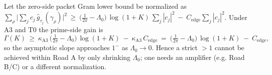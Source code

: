\begin{remark}
Let the zero-side packet Gram lower bound be normalized as
\(\sum_{\rho}\big|\sum_j c_j\,\widehat g_{\tau_j}(\gamma_\rho)\big|^2\ \ge\ \big(\tfrac{1}{2\pi}-\Lambda_0\big)\,\log(1{+}K)\,\sum_j|c_j|^2\ -\ C_{\mathrm{edge}}\sum_j|c_j|^2\).
Under A3 and T0 the prime-side gain is
\begin{equation}\label{eq:A3_calibration_kappa-formula-1}
 \Gamma(K)\ \ge\ \kappa_{\mathrm{A3}}\,\Big(\tfrac{1}{2\pi}-\Lambda_0\Big)\,\log(1{+}K)\ -\ \kappa_{\mathrm{A3}}\,C_{\mathrm{edge}}\ =\ \Big(\tfrac{1}{2\pi}-\Lambda_0\Big)\,\log(1{+}K)\ -\ C_{\mathrm{edge}},
\end{equation}
so the asymptotic slope approaches $1^{-}$ as $\Lambda_0\to0$. Hence a strict $>1$ cannot be achieved within Road A by only shrinking $\Lambda_0$; one needs an amplifier (e.g. Road B/C) or a different normalization.
\end{remark}
